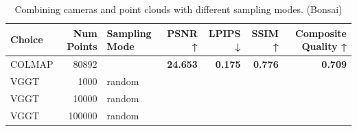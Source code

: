 \begin{table}[H]
\caption{Combining cameras and point clouds with different sampling modes. (Bonsai)}
\label{tab:07_combined_sampling_mode_bonsai}
\small
\begin{tabular}{lrlrrrr}
\toprule
Choice & Num Points & Sampling Mode & PSNR ↑ & LPIPS ↓ & SSIM ↑ & Composite Quality ↑ \\
\midrule
COLMAP & 80892 &  & \textbf{24.653} & \textbf{0.175} & \textbf{0.776} & \textbf{0.709} \\
VGGT & 1000 & random &  &  &  &  \\
VGGT & 10000 & random &  &  &  &  \\
VGGT & 100000 & random &  &  &  &  \\
\bottomrule
\end{tabular}
\end{table}
